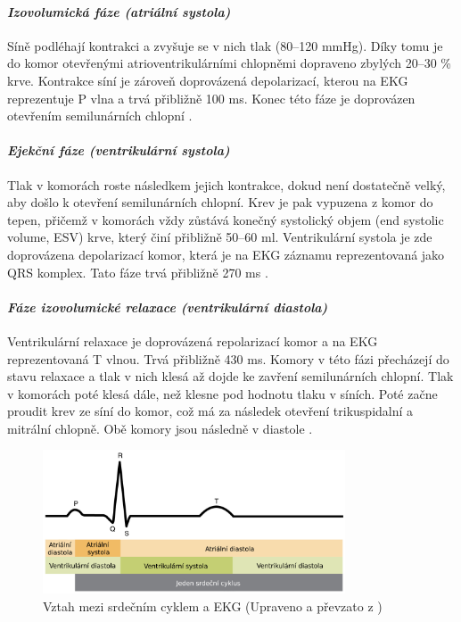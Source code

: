 \paragraph*{\textit{Izovolumická fáze (atriální systola)}\\} Síně podléhají
kontrakci a zvyšuje se v nich tlak (80--120 \si{\mmHg}). Díky tomu je do komor
otevřenými atrioventrikulárními chlopněmi dopraveno zbylých 20--30 \% krve.
Kontrakce síní je zároveň doprovázená depolarizací, kterou na EKG reprezentuje P
vlna a trvá přibližně 100 \si{\ms}. Konec této fáze je doprovázen otevřením
semilunárních chlopní \cite{OpenStax}.

\paragraph*{\textit{Ejekční fáze (ventrikulární systola)}\\} Tlak v komorách
roste následkem jejich kontrakce, dokud není dostatečně velký, aby došlo k
otevření semilunárních chlopní. Krev je pak vypuzena z komor do tepen, přičemž v
komorách vždy zůstává konečný systolický objem (end systolic volume, ESV) krve,
který činí přibližně 50--60 \si{\ml}. Ventrikulární systola je zde doprovázena
depolarizací komor, která je na EKG záznamu reprezentovaná jako QRS komplex.
Tato fáze trvá přibližně 270 \si{\ms} \cite{OpenStax}.

\paragraph*{\textit{Fáze izovolumické relaxace (ventrikulární diastola)}\\}
Ventrikulární relaxace je doprovázená repolarizací komor a na EKG reprezentovaná
T vlnou. Trvá přibližně 430 \si{\ms}. Komory v této fázi přecházejí do stavu relaxace
a tlak v nich klesá až dojde ke zavření semilunárních chlopní. Tlak v komorách
poté klesá dále, než klesne pod hodnotu tlaku v síních. Poté začne proudit krev
ze síní do komor, což má za následek otevření trikuspidalní a mitrální chlopně.
Obě komory jsou následně v diastole \cite{OpenStax}.

\begin{figure}[h]
	\begin{center}
		\includegraphics[width=0.8\textwidth]{../assets/anatomy/cardiac_cycle_ecg}
		\caption{Vztah mezi srdečním cyklem a EKG (Upraveno a převzato z
			\cite{OpenStax})}
		\label{fig:cardiac_cycle_ecg}
	\end{center}
\end{figure}


